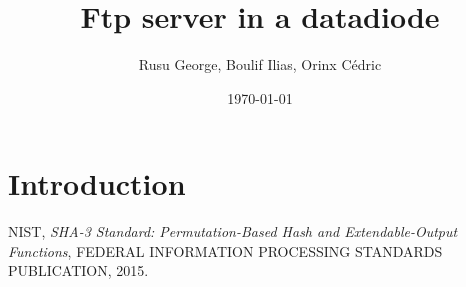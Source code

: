 \documentclass[a4paper,10pt]{article}
\title{Ftp server in a datadiode}
\author{Rusu George, Boulif Ilias, Orinx Cédric}
\date{\today}
\begin{document}
\maketitle
\tableofcontents
\newpage
\section{Introduction}

\begin{thebibliography}{9}

NIST,
\textit{SHA-3 Standard: Permutation-Based Hash and Extendable-Output Functions},
FEDERAL INFORMATION PROCESSING STANDARDS PUBLICATION,
2015.

\end{thebibliography}
\end{document}
